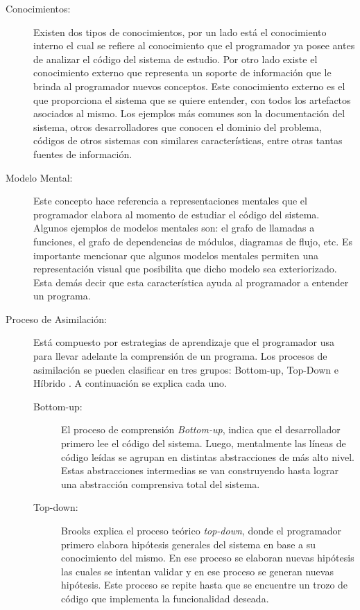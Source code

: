 \begin{description}

\item[Conocimientos:] Existen dos tipos de conocimientos, por un lado está el conocimiento interno el cual se refiere al conocimiento que el programador ya posee antes de analizar el código del sistema de estudio. Por otro lado existe el conocimiento externo que representa un soporte de información que le brinda al programador nuevos conceptos. Este conocimiento externo es el que proporciona el sistema que se quiere entender, con todos los artefactos asociados al mismo.
Los ejemplos más comunes son la documentación del sistema, otros desarrolladores que conocen el dominio del problema, códigos de otros sistemas con similares características, entre otras tantas fuentes de información.

\item[Modelo Mental:] Este concepto hace referencia a representaciones mentales que el programador elabora al momento de estudiar el código del sistema. 
Algunos ejemplos de modelos mentales son: el grafo de llamadas a funciones, el grafo de dependencias de módulos, diagramas de flujo, etc. Es importante mencionar que algunos modelos mentales permiten una representación visual que posibilita que dicho modelo sea exteriorizado. Esta demás decir que esta característica ayuda al programador a entender un programa.

\item[Proceso de Asimilación:] Está compuesto por estrategias de aprendizaje que el programador usa para llevar adelante la comprensión de un programa. Los procesos de asimilación se pueden clasificar en tres grupos: Bottom-up, Top-Down e Híbrido \cite{MPOB03,MAS05}. A continuación se explica cada uno.

\begin{description}

\item[Bottom-up:] El proceso de comprensión \textit{Bottom-up}, indica que el desarrollador primero lee el código del sistema. Luego, mentalmente las líneas de código leídas se agrupan en distintas abstracciones de más alto nivel. Estas abstracciones intermedias se van construyendo hasta lograr una abstracción comprensiva total del sistema.

\item[Top-down:] Brooks explica el proceso teórico \textit{top-down}, donde el programador primero elabora hipótesis generales del sistema en base a su conocimiento del mismo. En ese proceso se elaboran nuevas hipótesis las cuales se intentan validar y en ese proceso se generan nuevas hipótesis.
Este proceso se repite hasta que se encuentre un trozo de código que implementa la funcionalidad deseada.


\end{description}
\end{description}
